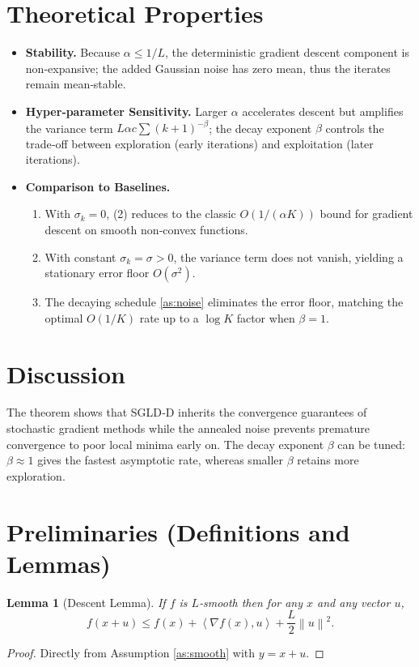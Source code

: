 \documentclass[11pt]{article}
\newtheorem{lemma}{Lemma}
\newcommand{\norm}[1]{\left\lVert#1\right\rVert}
\newcommand{\inner}[2]{\left\langle #1,#2\right\rangle}
\begin{document}
\section*{Theoretical Properties}
\begin{itemize}
\item \textbf{Stability.} Because $\alpha\le1/L$, the deterministic gradient descent component is non‑expansive; the added Gaussian noise has zero mean, thus the iterates remain mean‑stable.
\item \textbf{Hyper‑parameter Sensitivity.} Larger $\alpha$ accelerates descent but amplifies the variance term $L\alpha c\sum (k+1)^{-\beta}$; the decay exponent $\beta$ controls the trade‑off between exploration (early iterations) and exploitation (later iterations).
\item \textbf{Comparison to Baselines.}
    \begin{enumerate}[label=(\alph*)]
    \item With $\sigma_{k}=0$, (2) reduces to the classic $O(1/(\alpha K))$ bound for gradient descent on smooth non‑convex functions.
    \item With constant $\sigma_{k}=\sigma>0$, the variance term does not vanish, yielding a stationary error floor $O(\sigma^{2})$.
    \item The decaying schedule \eqref{as:noise} eliminates the error floor, matching the optimal $O(1/K)$ rate up to a $\log K$ factor when $\beta=1$.
    \end{enumerate}
\end{itemize}
\section*{Discussion}
The theorem shows that SGLD‑D inherits the convergence guarantees of stochastic gradient methods while the annealed noise prevents premature convergence to poor local minima early on. The decay exponent $\beta$ can be tuned: $\beta\approx1$ gives the fastest asymptotic rate, whereas smaller $\beta$ retains more exploration.

\newpage
\section*{Preliminaries (Definitions and Lemmas)}
\begin{lemma}[Descent Lemma]\label{lem:descent}
If $f$ is $L$‑smooth then for any $x$ and any vector $u$,
\[
f(x+u)\le f(x)+\inner{\nabla f(x)}{u}+\frac{L}{2}\norm{u}^{2}.
\tag{3}
\]
\end{lemma}
\begin{proof}
Directly from Assumption \ref{as:smooth} with $y=x+u$.
\end{proof}
\end{document}
